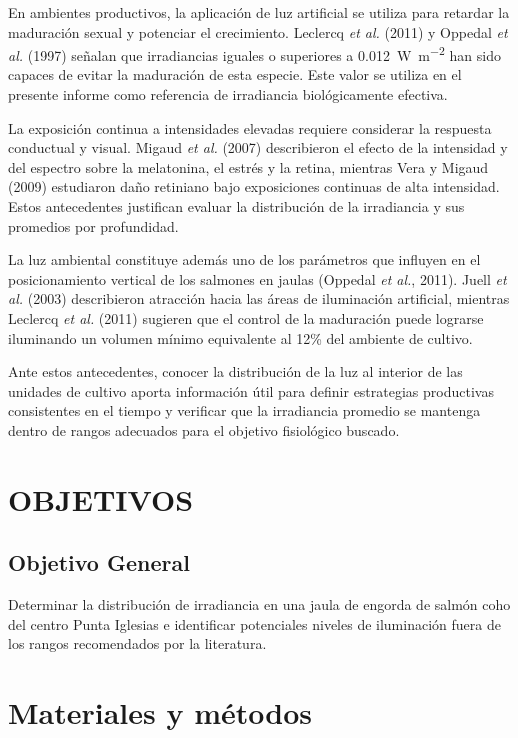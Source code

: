 \documentclass[11pt,letterpaper]{article}
\begin{document}
En ambientes productivos, la aplicación de luz artificial se utiliza para retardar la maduración sexual y potenciar el crecimiento. Leclercq \emph{et al.} (2011) y Oppedal \emph{et al.} (1997) señalan que irradiancias iguales o superiores a \SI{0.012}{\watt\per\square\metre} han sido capaces de evitar la maduración de esta especie. Este valor se utiliza en el presente informe como referencia de irradiancia biológicamente efectiva.

La exposición continua a intensidades elevadas requiere considerar la respuesta conductual y visual. Migaud \emph{et al.} (2007) describieron el efecto de la intensidad y del espectro sobre la melatonina, el estrés y la retina, mientras Vera y Migaud (2009) estudiaron daño retiniano bajo exposiciones continuas de alta intensidad. Estos antecedentes justifican evaluar la distribución de la irradiancia y sus promedios por profundidad.

La luz ambiental constituye además uno de los parámetros que influyen en el posicionamiento vertical de los salmones en jaulas (Oppedal \emph{et al.}, 2011). Juell \emph{et al.} (2003) describieron atracción hacia las áreas de iluminación artificial, mientras Leclercq \emph{et al.} (2011) sugieren que el control de la maduración puede lograrse iluminando un volumen mínimo equivalente al 12\% del ambiente de cultivo.

Ante estos antecedentes, conocer la distribución de la luz al interior de las unidades de cultivo aporta información útil para definir estrategias productivas consistentes en el tiempo y verificar que la irradiancia promedio se mantenga dentro de rangos adecuados para el objetivo fisiológico buscado.

\section{OBJETIVOS}

\subsection{Objetivo General}

Determinar la distribución de irradiancia en una jaula de engorda de salmón coho del centro Punta Iglesias e identificar potenciales niveles de iluminación fuera de los rangos recomendados por la literatura.

\section{Materiales y métodos}
\end{document}
